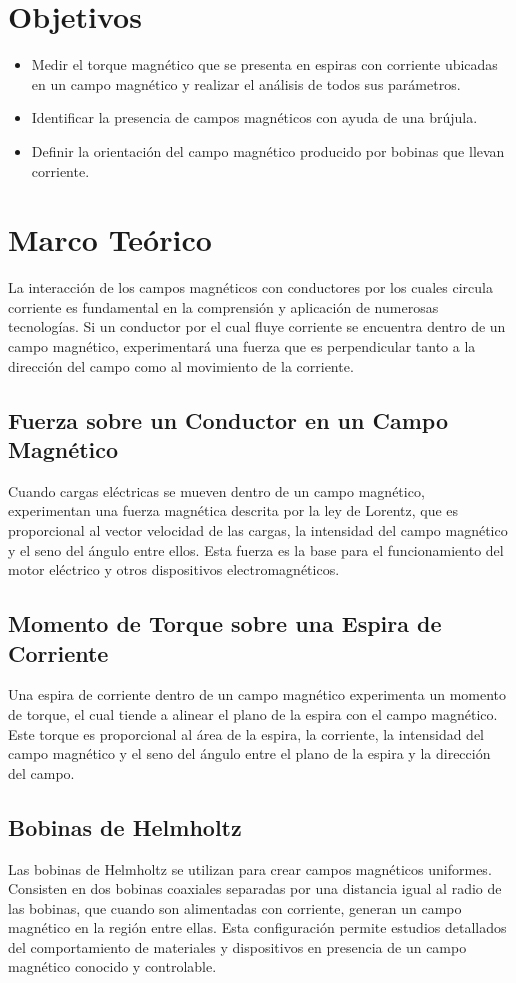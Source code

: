 \section{Objetivos}
\begin{itemize}
    \item Medir el torque magnético que se presenta en espiras con corriente ubicadas en un campo magnético y realizar el análisis de todos sus parámetros.
    \item Identificar la presencia de campos magnéticos con ayuda de una brújula.
    \item Definir la orientación del campo magnético producido por bobinas que llevan corriente.
\end{itemize}

\section{Marco Teórico}
La interacción de los campos magnéticos con conductores por los cuales circula corriente es fundamental en la comprensión y aplicación de numerosas tecnologías. Si un conductor por el cual fluye corriente se encuentra dentro de un campo magnético, experimentará una fuerza que es perpendicular tanto a la dirección del campo como al movimiento de la corriente.

\subsection{Fuerza sobre un Conductor en un Campo Magnético}
Cuando cargas eléctricas se mueven dentro de un campo magnético, experimentan una fuerza magnética descrita por la ley de Lorentz, que es proporcional al vector velocidad de las cargas, la intensidad del campo magnético y el seno del ángulo entre ellos. Esta fuerza es la base para el funcionamiento del motor eléctrico y otros dispositivos electromagnéticos.

\subsection{Momento de Torque sobre una Espira de Corriente}
Una espira de corriente dentro de un campo magnético experimenta un momento de torque, el cual tiende a alinear el plano de la espira con el campo magnético. Este torque es proporcional al área de la espira, la corriente, la intensidad del campo magnético y el seno del ángulo entre el plano de la espira y la dirección del campo.

\subsection{Bobinas de Helmholtz}
Las bobinas de Helmholtz se utilizan para crear campos magnéticos uniformes. Consisten en dos bobinas coaxiales separadas por una distancia igual al radio de las bobinas, que cuando son alimentadas con corriente, generan un campo magnético en la región entre ellas. Esta configuración permite estudios detallados del comportamiento de materiales y dispositivos en presencia de un campo magnético conocido y controlable.

